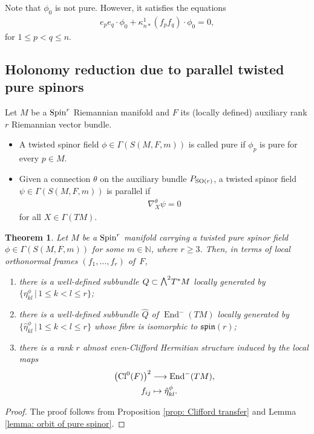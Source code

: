 \documentclass[pdftex]{sigma}
\newcommand{\ext}{\raise1pt\hbox{\small$\bigwedge$}}
\numberwithin{equation}{section}
\newtheorem{Theorem}{Theorem}[section]
\begin{document}
Note that $\phi_0$ is not pure. However, it satisfies the equations
\begin{gather*}
e_pe_q\cdot\phi_0 + \kappa_{n*}^1(f_pf_q)\cdot\phi_0 =0,
\end{gather*}
for $1\leq p<q\leq n$.

\subsection{Holonomy reduction due to parallel twisted pure spinors}

\begin{Definition}Let $M$ be a ${\rm Spin}^r$ Riemannian manifold and $F$ its (locally defined) auxiliary rank $r$ Riemannian vector bundle.
\begin{itemize}\itemsep=0pt
 \item A twisted spinor field $\phi\in\Gamma(S(M,F,m))$ is called pure if $\phi_p$ is pure for every $p\in M$.
 \item Given a connection $\theta$ on the auxiliary bundle $P_{{\rm SO}(r)}$, a twisted spinor field $\psi\in\Gamma(S(M,F,\allowbreak m))$ is parallel if
 \begin{gather*}\nabla_X^\theta\psi=0\end{gather*}
 for all $X\in\Gamma(TM)$.
\end{itemize}
\end{Definition}

\begin{Theorem} Let $M$ be a ${\rm Spin}^{r}$ manifold carrying a twisted pure spinor field $\phi\in\Gamma(S(M,F,\allowbreak m))$ for some $m\in\mathbb{N}$, where $r\geq 3$. Then, in terms of local orthonormal frames $(f_1,\dots,f_r)$ of~$F$,
 \begin{enumerate}\itemsep=0pt
 \item[$1)$] there is a well-defined subbundle $Q\subset \ext^2T^*M$ locally generated by $\{\eta_{kl}^\phi\, |\, 1\leq k<l\leq r\}$;
 \item[$2)$] there is a well-defined subbundle $\hat Q$ of $\operatorname{End}^-(TM)$ locally generated by $\{\hat\eta_{kl}^\phi\, |\, 1\leq k<l\leq r\}$ whose fibre is isomorphic to $\mathfrak{spin}(r)$;
 \item[$3)$] there is a rank $r$ almost even-Clifford Hermitian structure induced by the local maps
\begin{align*}
\big({\rm Cl}^0(F)\big)^2 &\longrightarrow \operatorname{End}^-(TM),\\
 f_{ij}&\mapsto \hat\eta_{kl}^\phi.
\end{align*}
 \end{enumerate}
\end{Theorem}
\begin{proof}The proof follows from Proposition \ref{prop: Clifford transfer} and Lemma \ref{lemma: orbit of pure spinor}.\end{proof}
\end{document}
